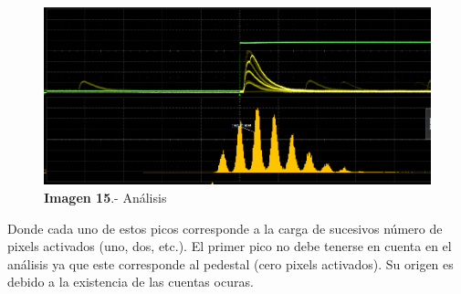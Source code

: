 \documentclass[11pt, a4paper]{article}
\begin{document}
\begin{figure}[hbtp]
 \centering
 \includegraphics[scale=0.2]{Analisis.png}
 \caption{\textbf{Imagen 15}.- Análisis}
 \end{figure}

Donde cada uno de estos picos corresponde a la carga de sucesivos número de pixels activados (uno, dos, etc.). El primer pico no debe tenerse en cuenta en el análisis ya que este corresponde al pedestal (cero pixels activados). Su origen es debido a la existencia de las cuentas ocuras.
 
\end{document}

